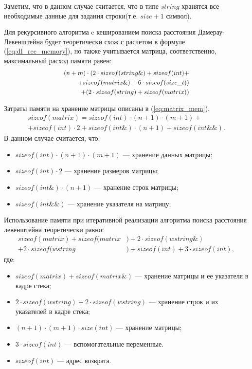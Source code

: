 Заметим, что в данном случае считается, что в типе $string$ хранятся все необходимые данные для задания строки(т.е. $size + 1$ символ).

Для рекурсивного алгоритма c кешированием поиска расстояния Дамерау-Левенштейна будет теоретически схож с расчетом в формуле (\ref{eq:dl_rec_memory}),
но также учитывается матрица, соответственно, максимальный расход памяти равен:
\begin{equation}
	\label{eq:dl_hash_memory}
    \small
	\begin{aligned}
		(n + m) \cdot (2 \cdot sizeof(string\&) + sizeof(int)+\\ +sizeof(matrix\&) + 6 \cdot sizeof(size\_t)) \\
        + (2 \cdot sizeof(string) + sizeof(matrix))
	\end{aligned}
\end{equation}

Затраты памяти на хранение матрицы описаны в  (\ref{eq:matrix_mem}).
\begin{equation}
	\label{eq:matrix_mem}
    \begin{aligned}
	sizeof(matrix) = sizeof(int) \cdot (n+1) \cdot (m + 1)+  \\
    + sizeof(int) \cdot 2 + sizeof(int\&) \cdot (n + 1) + sizeof(int\&\&).
    \end{aligned}
\end{equation}
В данном случае считается, что:
\begin{itemize}
	\item $sizeof(int) \cdot (n+1) \cdot (m + 1)$ --- хранение данных матрицы;
	\item $sizeof(int) \cdot 2$ --- хранение размеров матрицы;
	\item $sizeof(int\&) \cdot (n + 1)$ --- хранение строк матрицы;
	\item $sizeof(int\&\&)$ --- хранение указателя на матрицу;
\end{itemize}


Использование памяти при итеративной реализации алгоритма поиска расстояния левенштейна теоретически равно:
\begin{equation}
	\label{eq:lev_mtr_memory}
	\begin{aligned}
		sizeof(matrix) + sizeof(matrix&) + 2 \cdot sizeof(wstring\&)\\
        + 2 \cdot sizeof(wstring&) + sizeof(int) + 3 \cdot sizeof(int),
	\end{aligned}
\end{equation}
где:
\begin{itemize}
	\item $sizeof(matrix) + sizeof(matrix\&)$ --- хранение матрицы и ее указателя в кадре стека;
	\item $2 \cdot sizeof(wstring) + 2 \cdot sizeof(wstring)$ --- хранение строк и их указателей в кадре стека;
	\item $(n + 1) \cdot (m + 1) \cdot size(int)$ --- хранение матрицы;
	\item $3 \cdot sizeof(int)$ --- вспомогательные переменные.
	\item $sizeof(int)$ --- адрес возврата.
\end{itemize}

